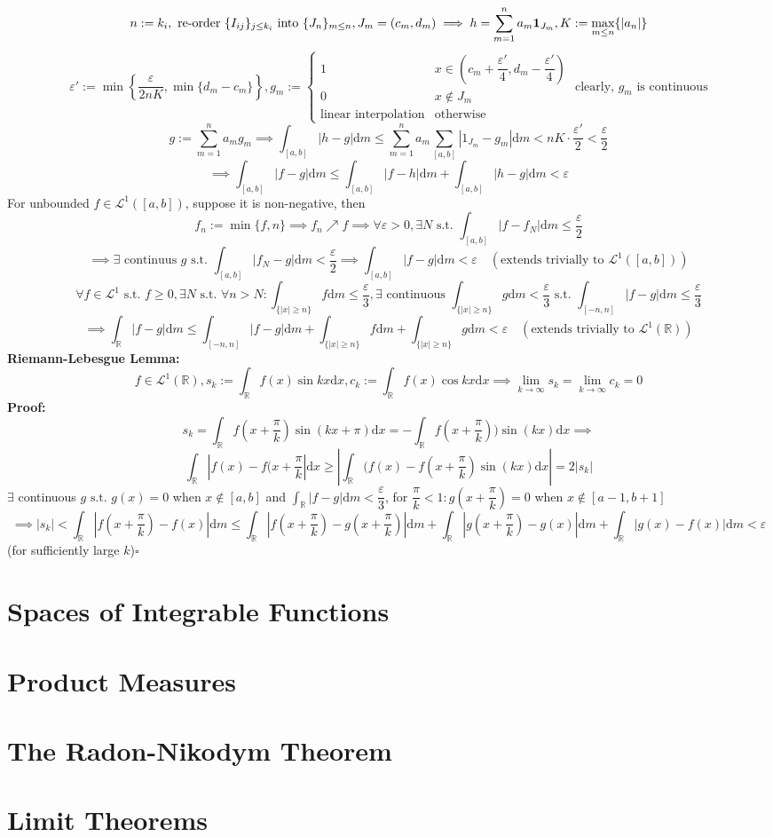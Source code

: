 \documentclass{article}
\newcommand{\R}{\mathbb{R}}
\newcommand{\summn}{\displaystyle\sum_{m=1}^n}
\newcommand{\limkinf}{\displaystyle\lim_{k\to\infty}}
\newcommand{\st}{\mbox{ s.t. }}
\newcommand{\0}{{\bf{0}}}
\newcommand{\1}{{\bf{1}}}
\newcommand{\dint}{\displaystyle\int}
\newcommand{\dif}{\mbox{d}}
\newcommand{\incto}{\nearrow}
\begin{document}
$$n:=k_i,\mbox{ re-order }\{I_{ij}\}_{j\le k_i}\mbox{ into }\{J_n\}_{m\le n},J_m=(c_m,d_m)\implies h=\summn a_m\1_{J_m},K:=\max_{m\le n}\{|a_n|\}$$
$$\varepsilon':=\min\left\{\frac{\varepsilon}{2nK},\min\{d_m-c_m\}\right\},g_m:=\begin{cases}
    1&x\in(c_m+\dfrac{\varepsilon'}{4},d_m-\dfrac{\varepsilon'}{4})\\
    0&x\notin J_m\\
    \mbox{linear interpolation}&\mbox{otherwise}
\end{cases}\mbox{ clearly, }g_m\mbox{ is continuous}$$
$$g:=\summn a_mg_m\implies\int_{[a,b]}|h-g|\dif m\le\summn a_m\sum_{[a,b]}|1_{J_m}-g_m|\dif m<nK\cdot\frac{\varepsilon'}{2}<\frac{\varepsilon}{2}$$
$$\implies\int_{[a,b]}|f-g|\dif m\le\int_{[a,b]}|f-h|\dif m+\int_{[a,b]}|h-g|\dif m<\varepsilon$$
For unbounded $f\in\mathcal{L}^1([a,b])$, suppose it is non-negative, then
$$f_n:=\min\{f,n\}\implies f_n\incto f\implies\forall\varepsilon>0,\exists N\st\int_{[a,b]}|f-f_N|\dif m\le\frac{\varepsilon}{2}$$
$$\implies\exists\mbox{ continuus }g\st\int_{[a,b]}|f_N-g|\dif m<\frac{\varepsilon}{2}\implies\int_{[a,b]}|f-g|\dif m<\varepsilon\quad(\mbox{extends trivially to }\mathcal{L}^1([a,b]))$$
$$\forall f\in\mathcal{L}^1\st f\geq0,\exists N\st\forall n>N:\int_{\{|x|\geq n\}}f\dif m\le\frac{\varepsilon}{3},\exists\mbox{ continuous }\int_{\{|x|\geq n\}}g\dif m<\frac{\varepsilon}{3}\st\int_{[-n,n]}|f-g|\dif m\le\frac{\varepsilon}{3}$$
$$\implies\int_\R|f-g|\dif m\le\int_{[-n,n]}|f-g|\dif m+\int_{\{|x|\geq n\}}f\dif m+\int_{\{|x|\geq n\}}g\dif m<\varepsilon\quad(\mbox{extends trivially to }\mathcal{L}^1(\R))$$
\textbf{Riemann-Lebesgue Lemma:}
$$f\in\mathcal{L}^1(\R),s_k:=\dint_\R f(x)\sin kx\dif x,c_k:=\int_\R f(x)\cos kx\dif x\implies\limkinf s_k=\limkinf c_k=0$$
\textbf{Proof:}
$$s_k=\int_\R f(x+\frac{\pi}{k})\sin(kx+\pi)\dif x=-\int_\R f(x+\frac{\pi}{k}))\sin(kx)\dif x\implies$$
$$\int_\R|f(x)-f(x+\frac{\pi}{k}|\dif x\geq\left|\int_\R(f(x)-f(x+\frac{\pi}{k})\sin(kx)\dif x\right|=2|s_k|$$
$\exists$ continuous $g\st g(x)=0$ when $x\notin[a,b]$ and $\dint_\R|f-g|\dif m<\dfrac{\varepsilon}{3}$, for $\dfrac{\pi}{k}<1:g(x+\dfrac{\pi}{k})=0$ when $x\notin[a-1,b+1]$
$$\implies|s_k|<\int_\R|f(x+\frac{\pi}{k})-f(x)|\dif m\le\int_\R|f(x+\frac{\pi}{k})-g(x+\frac{\pi}{k})|\dif m+\int_\R|g(x+\frac{\pi}{k})-g(x)|\dif m+\int_\R|g(x)-f(x)|\dif m<\varepsilon$$
(for sufficiently large $k$)\null\hfill{$\square$}
\clearpage
\section{Spaces of Integrable Functions}
\clearpage
\section{Product Measures}
\clearpage
\section{The Radon-Nikodym Theorem}
\clearpage
\section{Limit Theorems}
\clearpage
\end{document}
